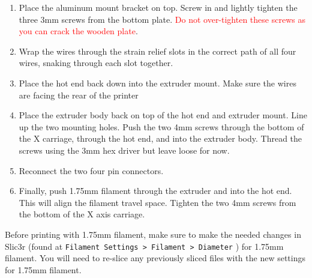 \begin{enumerate}
\item Place the aluminum mount bracket on top. Screw in and lightly tighten the three 3mm screws from the bottom plate. \textcolor{red}{Do not over-tighten these screws as you can crack the wooden plate}.
\item Wrap the wires through the strain relief slots in the correct path of all four wires, snaking through each slot together.
\item Place the hot end back down into the extruder mount. Make sure the wires are facing the rear of the printer
\item Place the extruder body back on top of the hot end and extruder mount. Line up the two mounting holes. Push the two 4mm screws through the bottom of the X carriage, through the hot end, and into the extruder body. Thread the screws using the 3mm hex driver but leave loose for now.
\item Reconnect the two four pin connectors.
\item Finally, push 1.75mm filament through the extruder and into the hot end. This will align the filament travel space. Tighten the two 4mm screws from the bottom of the X axis carriage.
\end{enumerate}

Before printing with 1.75mm filament, make sure to make the needed changes in Slic3r (found at \texttt{Filament Settings > Filament > Diameter}  ) for 1.75mm filament. You will need to re-slice any previously sliced files with the new settings for 1.75mm filament.
